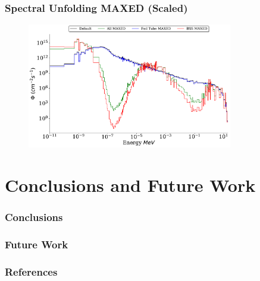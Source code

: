 \documentclass[fleqn]{beamer}
\begin{document}
\begin{frame}
\frametitle{Spectral Unfolding MAXED (Scaled)}

\begin{figure}
\centering
\includegraphics[width = 0.8\textwidth]{unfolded_mx_sc}
\caption{}
\end{figure}

\end{frame}

\section{Conclusions and Future Work}
\begin{frame}
\frametitle{Conclusions}

\end{frame}

\begin{frame}
\frametitle{Future Work}

\end{frame}

\begin{frame}[t,allowframebreaks]\label{lastframe}
\frametitle{References}

{\scriptsize
}
\end{frame}
\end{document}
